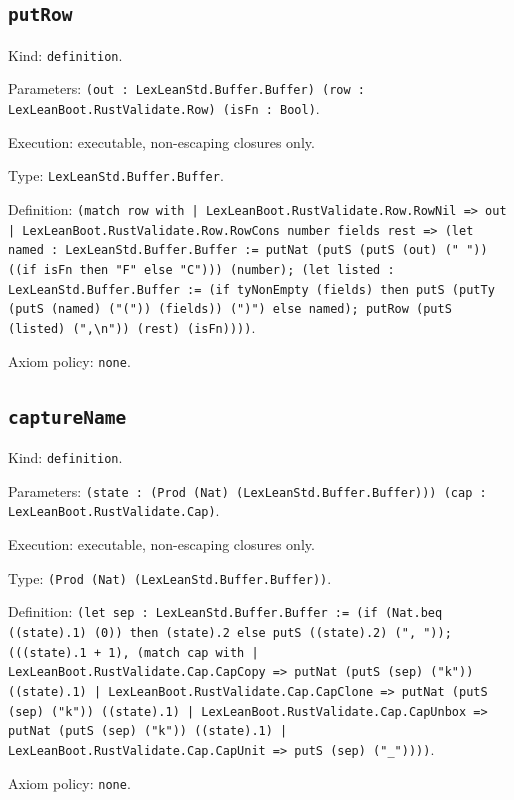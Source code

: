 \documentclass[11pt]{article}
\begin{document}
\subsection*{\texttt{putRow}}
\noindent Kind: \texttt{definition}.\par
\noindent Parameters: \texttt{(out : LexLeanStd.Buffer.Buffer) (row : LexLeanBoot.RustValidate.Row) (isFn : Bool)}.\par
\noindent Execution: executable, non-escaping closures only.\par
\noindent Type: \texttt{LexLeanStd.Buffer.Buffer}.\par
\noindent Definition: \texttt{(match row with | LexLeanBoot.RustValidate.Row.RowNil => out | LexLeanBoot.RustValidate.Row.RowCons number fields rest => (let named : LexLeanStd.Buffer.Buffer := putNat (putS (putS (out) ("    ")) ((if isFn then "F" else "C"))) (number); (let listed : LexLeanStd.Buffer.Buffer := (if tyNonEmpty (fields) then putS (putTy (putS (named) ("(")) (fields)) (")") else named); putRow (putS (listed) (",\textbackslash{}n")) (rest) (isFn))))}.\par
\noindent Axiom policy: \texttt{none}.\par
\subsection*{\texttt{captureName}}
\noindent Kind: \texttt{definition}.\par
\noindent Parameters: \texttt{(state : (Prod (Nat) (LexLeanStd.Buffer.Buffer))) (cap : LexLeanBoot.RustValidate.Cap)}.\par
\noindent Execution: executable, non-escaping closures only.\par
\noindent Type: \texttt{(Prod (Nat) (LexLeanStd.Buffer.Buffer))}.\par
\noindent Definition: \texttt{(let sep : LexLeanStd.Buffer.Buffer := (if (Nat.beq ((state).1) (0)) then (state).2 else putS ((state).2) (", ")); (((state).1 + 1), (match cap with | LexLeanBoot.RustValidate.Cap.CapCopy => putNat (putS (sep) ("k")) ((state).1) | LexLeanBoot.RustValidate.Cap.CapClone => putNat (putS (sep) ("k")) ((state).1) | LexLeanBoot.RustValidate.Cap.CapUnbox => putNat (putS (sep) ("k")) ((state).1) | LexLeanBoot.RustValidate.Cap.CapUnit => putS (sep) ("\_"))))}.\par
\noindent Axiom policy: \texttt{none}.\par
\end{document}
